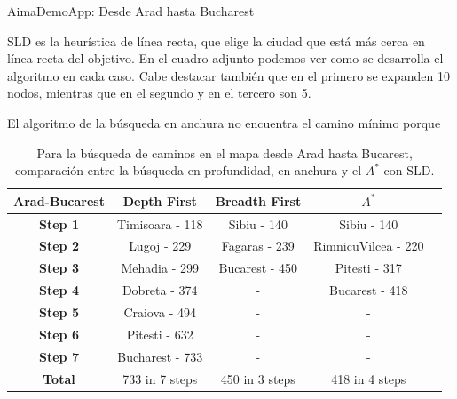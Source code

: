 \documentclass[11pt, a4paper, spanish, openright, twoside]{book}
\begin{document}
\begin{section}{AimaDemoApp: Desde Arad hasta Bucharest}


	
SLD es la heurística de línea recta, que elige la ciudad que está más cerca en línea recta del objetivo. En el cuadro adjunto podemos ver como se desarrolla el algoritmo en cada caso. Cabe destacar también que en el primero se expanden 10 nodos, mientras que en el segundo y en el tercero son 5.

El algoritmo de la búsqueda en anchura no encuentra el camino mínimo porque %

	\begin{table}	
		\begin{center}
			\begin{tabular}{|c||c|c|c|c|}
				\hline \textbf{Arad-Bucarest}	& \textbf{Depth First} 	& \textbf{Breadth First} 	& $A^*$ \\ \hline \hline
				\textbf{Step 1} 			&  	Timisoara - 118	& Sibiu - 140			& Sibiu - 140			\\ \hline 
				\textbf{Step 2} 			&  	Lugoj - 229		& Fagaras - 239		& RimnicuVilcea - 220	\\ \hline 
				\textbf{Step 3} 			&  	Mehadia - 299		& Bucarest - 450		& Pitesti - 317			\\ \hline 
				\textbf{Step 4} 			&  	Dobreta - 374		& -					& Bucarest - 418		\\ \hline 
				\textbf{Step 5} 			&  	Craiova - 494		& -					& -					\\ \hline 
				\textbf{Step 6} 			&  	Pitesti - 632		& -					& - 					\\ \hline 
				\textbf{Step 7} 			&  	Bucharest - 733	& -					& -					\\ \hline \hline
				\textbf{Total} 			&  	733 in 7 steps		&  450 in 3 steps		& 418 in 4 steps		\\ \hline 

			\end{tabular}
		\caption{Para la búsqueda de caminos en el mapa desde Arad hasta Bucarest, comparación entre la búsqueda en profundidad, en anchura y el $A^*$ con SLD.}
		\end{center}
	\end{table}


\end{section}
\end{document}
